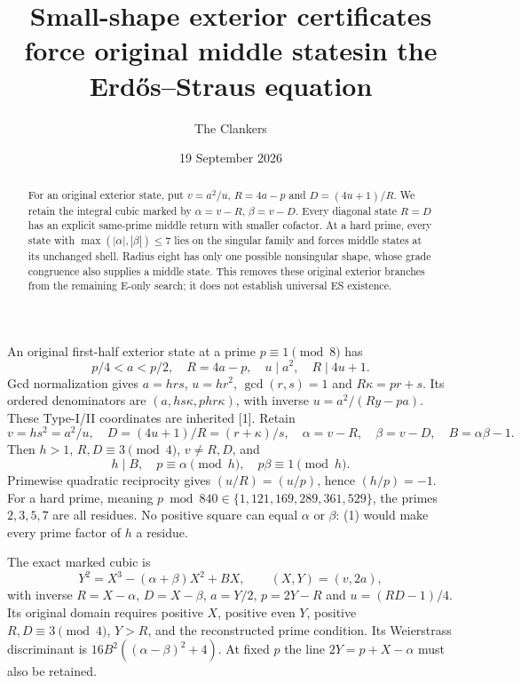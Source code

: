\documentclass[11pt,reqno]{amsart}
\title[Small-shape certificates and middle returns]{Small-shape exterior certificates force original middle states\newline in the Erd\H{o}s--Straus equation}
\author{The Clankers}\date{19 September 2026}
\begin{document}
\begin{abstract}
For an original exterior state, put $v=a^2/u$, $R=4a-p$ and $D=(4u+1)/R$.
We retain the integral cubic marked by $\alpha=v-R$, $\beta=v-D$.
Every diagonal state $R=D$ has an explicit same-prime middle return with smaller
cofactor. At a hard prime, every state with $\max(|\alpha|,|\beta|)\le7$ lies on
the singular family and forces middle states at its unchanged shell. Radius eight
has only one possible nonsingular shape, whose grade congruence also supplies a
middle state. This removes these original exterior branches from the remaining
E-only search; it does not establish universal ES existence.
\end{abstract}\maketitle

An original first-half exterior state at a prime $p\equiv1\pmod8$ has
\[
 p/4<a<p/2,\quad R=4a-p,\quad u\mid a^2,\quad R\mid4u+1.
\]
Gcd normalization gives $a=hrs$, $u=hr^2$, $\gcd(r,s)=1$ and
$R\kappa=pr+s$. Its ordered denominators are
$(a,hs\kappa,phr\kappa)$, with inverse $u=a^2/(Ry-pa)$.
These Type-I/II coordinates are inherited [1]. Retain
\[
 v=hs^2=a^2/u,\quad D=(4u+1)/R=(r+\kappa)/s,
 \quad \alpha=v-R,\quad\beta=v-D,\quad B=\alpha\beta-1.
\]
Then $h>1$, $R,D\equiv3\pmod4$, $v\ne R,D$, and
\[
 h\mid B,\quad p\equiv\alpha\pmod h,\quad p\beta\equiv1\pmod h. \tag{1}
\]
Primewise quadratic reciprocity gives $(u/R)=(u/p)$, hence $(h/p)=-1$.
For a hard prime, meaning $p\bmod840\in\{1,121,169,289,361,529\}$, the primes
$2,3,5,7$ are all residues. No positive square can equal $\alpha$ or $\beta$:
(1) would make every prime factor of $h$ a residue.

The exact marked cubic is
\[
 Y^2=X^3-(\alpha+\beta)X^2+BX,\qquad (X,Y)=(v,2a),       \tag{2}
\]
with inverse $R=X-\alpha$, $D=X-\beta$, $a=Y/2$, $p=2Y-R$ and
$u=(RD-1)/4$. Its original domain requires positive $X$, positive even $Y$,
positive $R,D\equiv3\pmod4$, $Y>R$, and the reconstructed prime condition.
Its Weierstrass discriminant is $16B^2((\alpha-\beta)^2+4)$.
At fixed $p$ the line $2Y=p+X-\alpha$ must also be retained.
\end{document}
